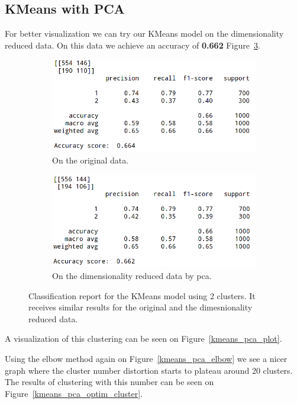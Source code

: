 \documentclass[runningheads]{llncs}
\begin{document}
\subsection{KMeans with PCA}
For better visualization we can try our KMeans model on the dimensionality reduced data. On this data we achieve an accuracy of \textbf{0.662} Figure~\ref{kmeans_pca}. 

\begin{figure}
  \centering
  \begin{subfigure}[b]{0.49\textwidth}
    \includegraphics[width=\textwidth]{images/kmeans.png}
    \caption{On the original data.}
    \label{kmeans}
  \end{subfigure}
  \hfill
  \begin{subfigure}[b]{0.49\textwidth}
    \includegraphics[width=\textwidth]{images/kmeans_pca.png}
    \caption{On the dimensionality reduced data by pca.}
    \label{kmeans_pca}
  \end{subfigure}
  \caption{Classification report for the KMeans model using 2 clusters. It receives similar results for the original and the dimesnionality reduced data.}
\end{figure}

A visualization of this clustering can be seen on Figure~\ref{kmeans_pca_plot}.

Using the elbow method again on Figure~\ref{kmeans_pca_elbow} we see a nicer graph where the cluster number distortion starts to plateau around 20 clusters. The results of clustering with this number can be seen on Figure~\ref{kmeans_pca_optim_cluster}.
\end{document}
